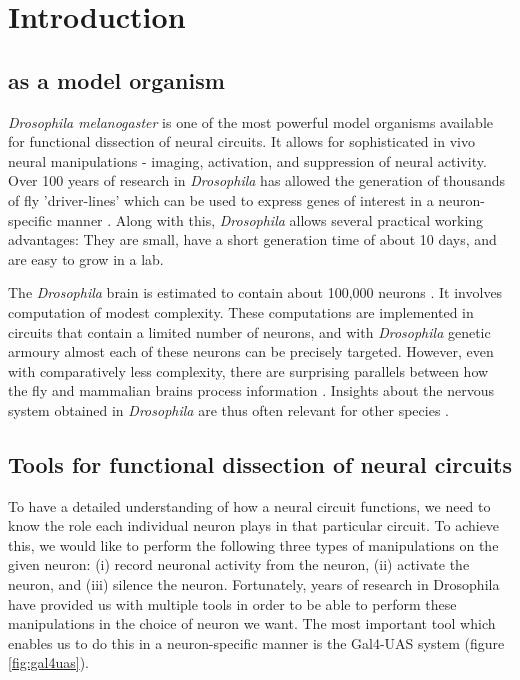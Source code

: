 \chapter{Introduction}
\label{chp:Introduction}


\section{\protect{} as a model organism}
\textit{Drosophila melanogaster} is one of the most powerful model organisms available for functional dissection of neural circuits. It allows for sophisticated in vivo neural manipulations - imaging, activation, and suppression of neural activity. Over 100 years of research in \textit{Drosophila} has allowed the generation of thousands of fly 'driver-lines' which can be used to express genes of interest in a neuron-specific manner \parencite{Pfeiffer2008}. Along with this, \textit{Drosophila} allows several practical working advantages: They are small, have a short generation time of about 10 days, and are easy to grow in a lab. 

The \textit{Drosophila} brain is estimated to contain about 100,000 neurons \parencite{Zheng2018}. It involves computation of modest complexity. These computations are implemented in circuits that contain a limited number of neurons, and with \textit{Drosophila} genetic armoury almost each of these neurons can be precisely targeted. However, even with comparatively less complexity, there are surprising parallels between how the fly and mammalian brains process information \parencite{Borst2015}. Insights about the nervous system obtained in \textit{Drosophila} are thus often relevant for other species \parencite{Bellen2010, Venken2011}.

\section{Tools for functional dissection of \protect{} neural circuits}
To have a detailed understanding of how a neural circuit functions, we need to know the role each individual neuron plays in that particular circuit. To achieve this, we would like to perform the following three types of manipulations on the given neuron: (i) record neuronal activity from the neuron, (ii) activate the neuron, and (iii) silence the neuron. Fortunately, years of research in Drosophila have provided us with multiple tools in order to be able to perform these manipulations in the choice of neuron we want. The most important tool which enables us to do this in a neuron-specific manner is the Gal4-UAS system (figure \ref{fig:gal4uas}). 

